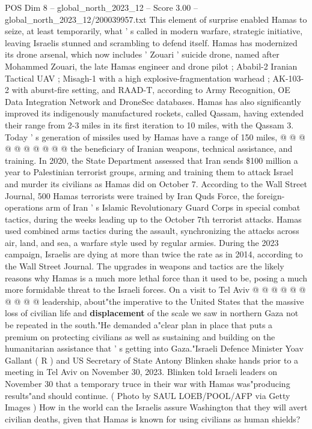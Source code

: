 \begin{textsample}{POS Dim 8 – global\_north\_2023\_12 – Score 3.00 – global\_north\_2023\_12/200039957.txt}
This element of surprise enabled Hamas to seize, at least temporarily, what ' s called in modern warfare, strategic initiative, leaving Israelis stunned and scrambling to defend itself.
Hamas has modernized its drone arsenal, which now includes ' Zouari ' suicide drone, named after Mohammed Zouari, the late Hamas engineer and drone pilot ; Ababil-2 Iranian Tactical UAV ; Misagh-1 with a high explosive-fragmentation warhead ; AK-103-2 with aburst-fire setting, and RAAD-T, according to Army Recognition, OE Data Integration Network and DroneSec databases.
Hamas has also significantly improved its indigenously manufactured rockets, called Qassam, having extended their range from 2-3 miles in its first iteration to 10 miles, with the Qassam 3.
Today ' s generation of missiles used by Hamas have a range of 150 miles, @ @ @ @ @ @ @ @ @ @ the beneficiary of Iranian weapons, technical assistance, and training.
In 2020, the State Department assessed that Iran sends \$100 million a year to Palestinian terrorist groups, arming and training them to attack Israel and murder its civilians as Hamas did on October 7.
According to the Wall Street Journal, 500 Hamas terrorists were trained by Iran Quds Force, the foreign-operations arm of Iran ' s Islamic Revolutionary Guard Corps in special combat tactics, during the weeks leading up to the October 7th terrorist attacks.
Hamas used combined arms tactics during the assault, synchronizing the attacks across air, land, and sea, a warfare style used by regular armies.
During the 2023 campaign, Israelis are dying at more than twice the rate as in 2014, according to the Wall Street Journal.
The upgrades in weapons and tactics are the likely reasons why Hamas is a much more lethal force than it used to be, posing a much more formidable threat to the Israeli forces.
On a visit to Tel Aviv @ @ @ @ @ @ @ @ @ @ leadership, about"the imperative to the United States that the massive loss of civilian life and \textbf{displacement} of the scale we saw in northern Gaza not be repeated in the south."He demanded a"clear plan in place that puts a premium on protecting civilians as well as sustaining and building on the humanitarian assistance that ' s getting into Gaza."Israeli Defence Minister Yoav Gallant ( R ) and US Secretary of State Antony Blinken shake hands prior to a meeting in Tel Aviv on November 30, 2023.
Blinken told Israeli leaders on November 30 that a temporary truce in their war with Hamas was"producing results"and should continue. ( Photo by SAUL LOEB/POOL/AFP via Getty Images ) How in the world can the Israelis assure Washington that they will avert civilian deaths, given that Hamas is known for using civilians as human shields?

\end{textsample}
